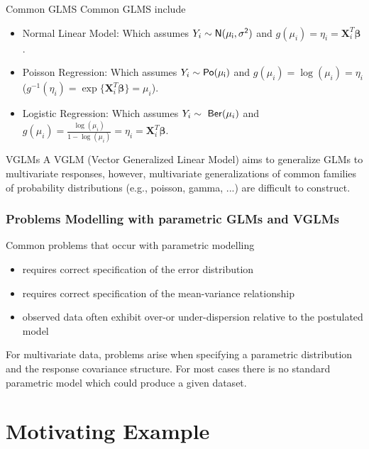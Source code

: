 \documentclass[9pt,notes=hide]{beamer}
\newcommand{\vect}[1]{\boldsymbol #1}
\newcommand{\Po}{\sf Po}
\newcommand{\Nor}{\sf N}
\newcommand{\vbe}{\vect{\beta}}
\newcommand{\X}{\vect{X}}
\begin{document}
\begin{frame}{Common GLMS}
	Common GLMS include \pause
	\pause[\thebeamerpauses]
	\begin{itemize}[<+->]
		\item  Normal Linear Model: Which assumes $Y_i \sim \Nor(\mu_i, \sigma^2)$ and $g(\mu_i) = \eta_i = \X_i^T\vbe$.
		\item  Poisson Regression: Which assumes $Y_i \sim \Po(\mu_i)$ and $g(\mu_i) = \log(\mu_i) = \eta_i$ ($g^{-1}(\eta_i) = \exp\{\X_i^T\vbe\} = \mu_i$).
		\item  Logistic Regression: Which assumes $Y_i \sim \ {\sf Ber}(\mu_i)$ and $g(\mu_i) = \frac{\log(\mu_i)}{1 - \log(\mu_i)} = \eta_i =  \X_i^T\vbe$.
	\end{itemize}
\end{frame}


\begin{frame}{VGLMs}
	A VGLM (Vector Generalized Linear Model)  aims to generalize GLMs to
	multivariate responses, however,  multivariate generalizations of common
	families of probability distributions (e.g., poisson, gamma, ...) are
	difficult to construct.
\end{frame}



\begin{frame}
	\frametitle{Problems Modelling with parametric GLMs and VGLMs}
	Common problems that occur with parametric modelling\pause
	\pause[\thebeamerpauses]
	\begin{itemize}[<+->]
		\item requires correct specification of the error distribution
		\item requires correct specification of the mean-variance relationship
		\item observed data often exhibit over-or under-dispersion relative to the postulated model
	\end{itemize}
	\pause[\thebeamerpauses]
	For multivariate data, problems arise when specifying a parametric distribution and the response covariance structure.
	For most cases there is no standard parametric model which could produce a given dataset.
\end{frame}


\section{Motivating Example}
\end{document}
